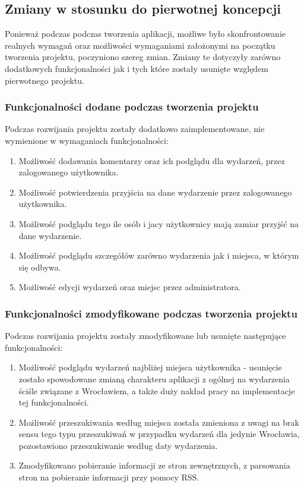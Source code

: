 \documentclass[a4paper]{article}
\begin{document}
\subsection{Zmiany w stosunku do pierwotnej koncepcji}

Ponieważ podczas podczas tworzenia aplikacji, możliwe było skonfrontowanie realnych wymagań oraz możliwości wymaganiami 
założonymi na początku tworzenia projektu, poczyniono szereg zmian.
Zmiany te dotyczyły zarówno dodatkowych funkcjonalności jak i tych które zostały usunięte względem pierwotnego projektu.

\subsubsection{Funkcjonalności dodane podczas tworzenia projektu}
Podczas rozwijania projektu zostały dodatkowo zaimplementowane, nie wymienione w wymaganiach funkcjonalności:
\begin{enumerate}
 \item Możliwość dodawania komentarzy oraz ich podglądu dla wydarzeń, przez zalogowanego użytkownika.
 \item Możliwość potwierdzenia przyjścia na dane wydarzenie przez zalogowanego użytkownika.
 \item Możliwość podglądu tego ile osób i jacy użytkownicy mają zamiar przyjść na dane wydarzenie.
 \item Możliwość podglądu szczegółów zarówno wydarzenia jak i miejsca, w którym się odbywa.
 \item Możliwość edycji wydarzeń oraz miejsc przez administratora. 
\end{enumerate}
\subsubsection{Funkcjonalności zmodyfikowane podczas tworzenia projektu}
Podczas rozwijania projektu zostały zmodyfikowane lub usunięte następujące funkcjonalności:
\begin{enumerate}
 \item Możliwość podglądu wydarzeń najbliżej miejsca użytkownika - usunięcie zostało spowodowane zmianą charakteru aplikacji z ogólnej na 
wydarzenia ściśle związane z Wrocławiem, a także duży nakład pracy na implementacje tej funkcjonalności.
\item Możliwość przeszukiwania według miejsca została zmieniona z uwagi na brak sensu tego typu przeszukiwań w przypadku wydarzeń
dla jedynie Wrocławia, pozostawiono przeszukiwanie według daty wydarzenia.
\item Zmodyfikowano pobieranie informacji ze stron zewnętrznych, z parsowania stron na pobieranie informacji przy pomocy RSS.
\end{enumerate}
\end{document}
